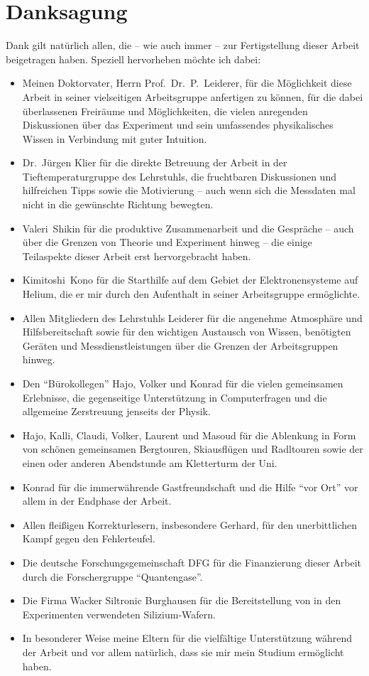 \section*{Danksagung}
Dank gilt natürlich allen, die -- wie auch immer -- zur Fertigstellung dieser Arbeit beigetragen haben. Speziell hervorheben möchte ich dabei:
\begin{itemize}
	\item Meinen Doktorvater, Herrn Prof.~Dr.~P.~Leiderer, für die Möglichkeit diese Arbeit in seiner vielseitigen Arbeitsgruppe anfertigen zu können, für die dabei überlassenen Freiräume und Möglichkeiten, die vielen anregenden Diskussionen über das Experiment und sein umfassendes physikalisches Wissen in Verbindung mit guter Intuition.
	\item Dr.~Jürgen Klier für die direkte Betreuung der Arbeit in der Tieftemperaturgruppe des Lehrstuhls, die fruchtbaren Diskussionen und hilfreichen Tipps sowie die Motivierung -- auch wenn sich die Messdaten mal nicht in die gewünschte Richtung bewegten.
	\item Valeri~Shikin für die produktive Zusammenarbeit und die Gespräche -- auch über die Grenzen von Theorie und Experiment hinweg -- die einige Teilaspekte dieser Arbeit erst hervorgebracht haben.
	\item Kimitoshi~Kono für die Starthilfe auf dem Gebiet der Elektronensysteme auf Helium, die er mir durch den Aufenthalt in seiner Arbeitsgruppe ermöglichte.
	\item Allen Mitgliedern des Lehrstuhls Leiderer für die angenehme Atmosphäre und Hilfsbereitschaft sowie für den wichtigen Austausch von Wissen, benötigten Geräten und Messdienstleistungen über die Grenzen der Arbeitsgruppen hinweg.
	\item Den "`Bürokollegen"' Hajo, Volker und Konrad für die vielen gemeinsamen Erlebnisse, die gegenseitige Unterstützung in Computerfragen und die allgemeine Zerstreuung jenseits der Physik.
	\item Hajo, Kalli, Claudi, Volker, Laurent und Masoud für die Ablenkung in Form von schönen gemeinsamen Bergtouren, Skiausflügen und Radltouren sowie der einen oder anderen Abendstunde am Kletterturm der Uni.
	\item Konrad für die immerwährende Gastfreundschaft und die Hilfe "`vor Ort"' vor allem in der Endphase der Arbeit.
	\item Allen fleißigen Korrekturlesern, insbesondere Gerhard, für den unerbittlichen Kampf gegen den Fehlerteufel.
	\item Die deutsche Forschungsgemeinschaft DFG für die Finanzierung dieser Arbeit durch die Forschergruppe "`Quantengase"'.
	\item Die Firma Wacker Siltronic Burghausen für die Bereitstellung von in den Experimenten verwendeten Silizium-Wafern.
	\item In besonderer Weise meine Eltern für die vielfältige Unterstützung während der Arbeit und vor allem natürlich, dass sie mir mein Studium ermöglicht haben. 
\end{itemize}
